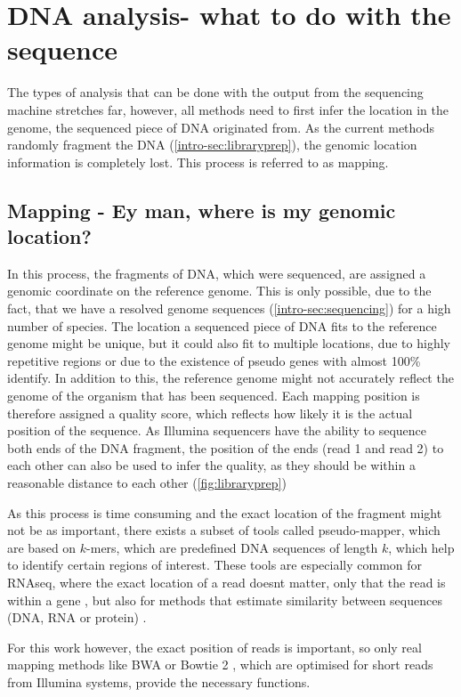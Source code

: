 \section[DNA analysis]{DNA analysis- what to do with the sequence}
\label{intro-sec:analysis}
The types of analysis that can be done with the output from the sequencing machine stretches far,  however, all methods need to first infer the location in the genome, the sequenced piece of DNA originated from. As the current methods randomly fragment the DNA (\autoref{intro-sec:libraryprep}), the genomic location information is completely lost. This process is referred to as mapping.

\subsection[Mapping]{Mapping - Ey man, where is my genomic location?}
\label{intro-sec:mapping}
In this process, the fragments of DNA, which were sequenced, are assigned a genomic coordinate on the reference genome. This is only possible, due to the fact, that we have a resolved genome sequences (\autoref{intro-sec:sequencing}) for a high number of species. The location a sequenced piece of DNA fits to the reference genome might be unique, but it could also fit to multiple locations, due to highly repetitive regions or due to the existence of pseudo genes with almost 100\% identify. In addition to this, the reference genome might not accurately reflect the genome of the organism that has been sequenced. Each mapping position is therefore assigned a quality score, which reflects how likely it is the actual position of the sequence. As Illumina sequencers have the ability to sequence both ends of the DNA fragment, the position of the ends (read 1 and read 2) to each other can also be used to infer the quality, as they should be within a reasonable distance to each other (\autoref{fig:libraryprep})

As this process is time consuming and the exact location of the fragment might not be as important, there exists a subset of tools called pseudo-mapper, which are based on $k$-mers, which are predefined DNA sequences of length $k$, which help to identify certain regions of interest. These tools are especially common for RNAseq, where the exact location of a read doesnt matter, only that the read is within a gene \cite{Bray2016,Patro2017}, but also for methods that estimate similarity between sequences (DNA, RNA or protein) \cite{Ondov2016,Luczak2017}.

For this work however, the exact position of reads is important, so only real mapping methods like BWA \cite{Li2013} or Bowtie 2 \cite{Langmead2018}, which are optimised for short reads from Illumina systems, provide the necessary functions.

